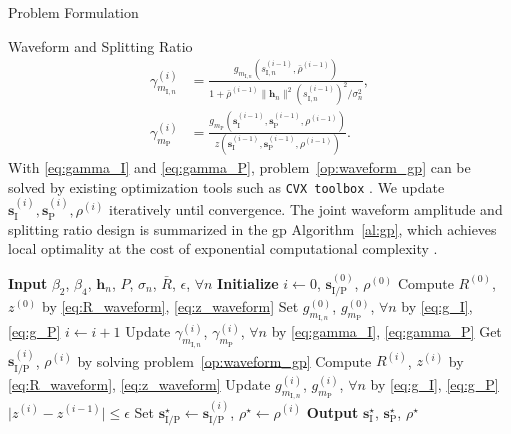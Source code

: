 \begin{section}{Problem Formulation}
\begin{subsection}{Waveform and Splitting Ratio}
		\begin{align}
			\gamma_{m_{\mathrm{I},n}}^{(i)} & = \frac{g_{m_{\mathrm{I},n}}(s_{\mathrm{I},n}^{(i-1)},\bar{\rho}^{(i-1)})}{1+{\bar{\rho}^{(i-1)}\lVert{\mathbf{h}_n}\rVert^2 (s_{\mathrm{I},n}^{(i-1)})^2}\big/{\sigma_n^2}}\label{eq:gamma_I},\\
			\gamma_{m_\mathrm{P}}^{(i)} & = \frac{g_{m_\mathrm{P}}(\mathbf{s}_{\mathrm{I}}^{(i-1)},\mathbf{s}_\mathrm{P}^{(i-1)},\rho^{(i-1)})}{z(\mathbf{s}_{\mathrm{I}}^{(i-1)},\mathbf{s}_\mathrm{P}^{(i-1)},\rho^{(i-1)})}\label{eq:gamma_P}.
		\end{align}
		With \eqref{eq:gamma_I} and \eqref{eq:gamma_P}, problem~\eqref{op:waveform_gp} can be solved by existing optimization tools such as \texttt{CVX toolbox} \cite{Grant2016}. We update $\mathbf{s}_{\mathrm{I}}^{(i)},\mathbf{s}_\mathrm{P}^{(i)},\rho^{(i)}$ iteratively until convergence. The joint waveform amplitude and splitting ratio design is summarized in the \gls{gp} Algorithm~\ref{al:gp}, which achieves local optimality at the cost of exponential computational complexity \cite{Chiang2005}.

		\begin{algorithm}[!t]
			\caption{\gls{gp}: Waveform Amplitude and Splitting Ratio.}
			\label{al:gp}
			\begin{algorithmic}[1]
				\State \textbf{Input} $\beta_2$, $\beta_4$, $\mathbf{h}_n$, $P$, $\sigma_n$, $\bar{R}$, $\epsilon$, $\forall n$
				\State \textbf{Initialize} $i \gets 0$, $\mathbf{s}_{\mathrm{I/P}}^{(0)}$, $\rho^{(0)}$
				\State Compute $R^{(0)}$, $z^{(0)}$ by \eqref{eq:R_waveform}, \eqref{eq:z_waveform}
				\State Set $g_{m_{\mathrm{I},n}}^{(0)}$, $g_{m_\mathrm{P}}^{(0)}$, $\forall n$ by \eqref{eq:g_I}, \eqref{eq:g_P}
				\Repeat
					\State $i \gets i + 1$
					\State Update $\gamma_{m_{\mathrm{I},n}}^{(i)}$, $\gamma_{m_\mathrm{P}}^{(i)}$, $\forall n$ by \eqref{eq:gamma_I}, \eqref{eq:gamma_P}
					\State Get $\mathbf{s}_{\mathrm{I/P}}^{(i)}$, $\rho^{(i)}$ by solving problem~\eqref{op:waveform_gp}
					\State Compute $R^{(i)}$, $z^{(i)}$ by \eqref{eq:R_waveform}, \eqref{eq:z_waveform}
					\State Update $g_{m_{\mathrm{I},n}}^{(i)}$, $g_{m_\mathrm{P}}^{(i)}$, $\forall n$ by \eqref{eq:g_I}, \eqref{eq:g_P}
				\Until $\lvert z^{(i)} - z^{(i-1)} \rvert \le \epsilon$
				\State Set $\mathbf{s}_{\mathrm{I/P}}^{\star} \gets \mathbf{s}_{\mathrm{I/P}}^{(i)}$, $\rho^{\star} \gets \rho^{(i)}$
				\State \textbf{Output} $\mathbf{s}_{\mathrm{I}}^{\star}$, $\mathbf{s}_{\mathrm{P}}^{\star}$, $\rho^{\star}$
			\end{algorithmic}
		\end{algorithm}


\end{subsection}
\end{section}
